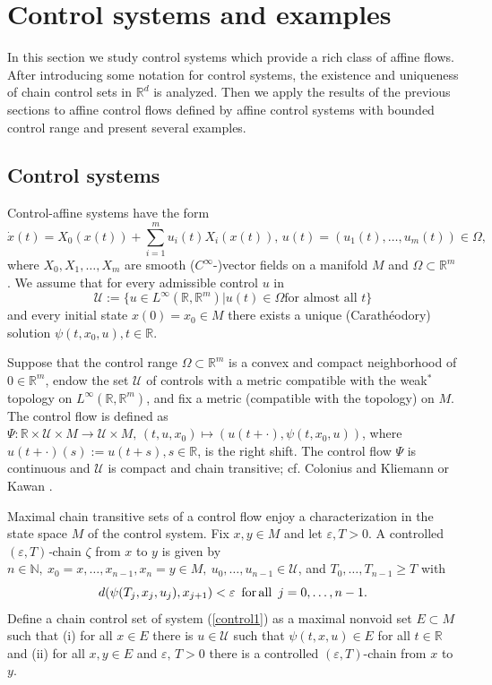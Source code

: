	\section{Control systems and examples\label{Section6}}
	
	In this section we study control systems which provide a rich class of affine
	flows. After introducing some notation for control systems, the existence and
	uniqueness of chain control sets in $\mathbb{R}^{d}$ is analyzed. Then we
	apply the results of the previous sections to affine control flows defined by
	affine control systems with bounded control range and present several examples.
	
	\subsection{Control systems}
	
	Control-affine systems have the form
	\begin{equation}
		\dot{x}(t)=X_{0}(x(t))+\sum_{i=1}^{m}u_{i}(t)X_{i}(x(t)),\,u(t)=(u_{1}%
		(t),\ldots,u_{m}(t))\in\Omega,\label{control1}%
	\end{equation}
	where $X_{0},X_{1},\ldots,X_{m}$ are smooth ($C^{\infty}$-)vector fields on a
	manifold $M$ and $\Omega\subset\mathbb{R}^{m}$. We assume that for every
	admissible control $u$ in
	\[
	\mathcal{U}:=\{u\in L^{\infty}(\mathbb{R},\mathbb{R}^{m})\left\vert
	u(t)\in\Omega\mbox{
		for almost all }t\right.  \}
	\]
	and every initial state $x(0)=x_{0}\in M$ there exists a unique
	(Carath\'{e}odory) solution $\psi(t,x_{0},u),t\in\mathbb{R}$.
	
	Suppose that the control range $\Omega\subset\mathbb{R}^{m}$ is a convex and
	compact neighborhood of $0\in\mathbb{R}^{m}$, endow the set $\mathcal{U}$ of
	controls with a metric compatible with the weak$^{\ast}$ topology on
	$L^{\infty}(\mathbb{R},\mathbb{R}^{m})$, and fix a metric (compatible with the
	topology) on $M$. The control flow is defined as $\Psi:\mathbb{R}%
	\times\mathcal{U}\times M\rightarrow\mathcal{U}\times M,\,(t,u,x_{0}%
	)\mapsto(u(t+\cdot),\psi(t,x_{0},u))$, where $u(t+\cdot)(s):=u(t+s),s\in
	\mathbb{R}$, is the right shift. The control flow $\Psi$ is continuous and
	$\mathcal{U}$ is compact and chain transitive; cf. Colonius and Kliemann
	\cite[Chapter 4]{ColK00} or Kawan \cite[Section 1.4]{Kawa13}.
	
	Maximal chain transitive sets of a control flow enjoy a characterization in
	the state space $M$ of the control system. Fix $x,y\in M$ and let
	$\varepsilon,T>0.$ A controlled $(\varepsilon,T)$\textit{-}chain $\zeta$ from
	$x$ to $y$ is given by $n\in\mathbb{N},\ x_{0}=x,\ldots,x_{n-1},x_{n}=y\in
	M,\ u_{0},\ldots,u_{n-1}\in\mathcal{U}$, and $T_{0},\ldots,T_{n-1}\geq T$
	with
	\[
	d(\psi(T_{j},x_{j},u_{j}),x_{j+1})<\varepsilon\mbox{ }\,\mbox{for\thinspace
		all}\,\,\,j=0,\ldots,n-1.
	\]
	Define a chain control set of system (\ref{control1}) as a maximal nonvoid set
	$E\subset M$ such that (i) for all $x\in E$ there is $u\in\mathcal{U}$ such
	that $\psi(t,x,u)\in E$ for all $t\in\mathbb{R}$ and (ii) for all $x,y\in E$
	and $\varepsilon,\,T>0$ there is a controlled $(\varepsilon,T)$-chain from $x$
	to $y$.
	
